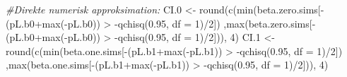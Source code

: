 \documentclass[
]{article}
\newenvironment{Shaded}{\begin{snugshade}}{\end{snugshade}}
\newcommand{\AttributeTok}[1]{\textcolor[rgb]{0.77,0.63,0.00}{#1}}
\newcommand{\CommentTok}[1]{\textcolor[rgb]{0.56,0.35,0.01}{\textit{#1}}}
\newcommand{\DecValTok}[1]{\textcolor[rgb]{0.00,0.00,0.81}{#1}}
\newcommand{\FloatTok}[1]{\textcolor[rgb]{0.00,0.00,0.81}{#1}}
\newcommand{\FunctionTok}[1]{\textcolor[rgb]{0.00,0.00,0.00}{#1}}
\newcommand{\NormalTok}[1]{#1}
\newcommand{\OtherTok}[1]{\textcolor[rgb]{0.56,0.35,0.01}{#1}}
\newcommand{\SpecialCharTok}[1]{\textcolor[rgb]{0.00,0.00,0.00}{#1}}
\begin{document}
\begin{Shaded}
\begin{Highlighting}[]
\CommentTok{\#Direkte numerisk approksimation:}
\NormalTok{CI}\FloatTok{.0} \OtherTok{\textless{}{-}} \FunctionTok{round}\NormalTok{(}\FunctionTok{c}\NormalTok{(}\FunctionTok{min}\NormalTok{(beta.zero.sims[}\SpecialCharTok{{-}}\NormalTok{(pL.b0}\SpecialCharTok{+}\FunctionTok{max}\NormalTok{(}\SpecialCharTok{{-}}\NormalTok{pL.b0)) }\SpecialCharTok{\textgreater{}} \SpecialCharTok{{-}}\FunctionTok{qchisq}\NormalTok{(}\FloatTok{0.95}\NormalTok{, }\AttributeTok{df =} \DecValTok{1}\NormalTok{)}\SpecialCharTok{/}\DecValTok{2}\NormalTok{])}
\NormalTok{           ,}\FunctionTok{max}\NormalTok{(beta.zero.sims[}\SpecialCharTok{{-}}\NormalTok{(pL.b0}\SpecialCharTok{+}\FunctionTok{max}\NormalTok{(}\SpecialCharTok{{-}}\NormalTok{pL.b0)) }\SpecialCharTok{\textgreater{}} \SpecialCharTok{{-}}\FunctionTok{qchisq}\NormalTok{(}\FloatTok{0.95}\NormalTok{, }\AttributeTok{df =} \DecValTok{1}\NormalTok{)}\SpecialCharTok{/}\DecValTok{2}\NormalTok{])), }\DecValTok{4}\NormalTok{)}
\NormalTok{CI}\FloatTok{.1} \OtherTok{\textless{}{-}} \FunctionTok{round}\NormalTok{(}\FunctionTok{c}\NormalTok{(}\FunctionTok{min}\NormalTok{(beta.one.sims[}\SpecialCharTok{{-}}\NormalTok{(pL.b1}\SpecialCharTok{+}\FunctionTok{max}\NormalTok{(}\SpecialCharTok{{-}}\NormalTok{pL.b1)) }\SpecialCharTok{\textgreater{}} \SpecialCharTok{{-}}\FunctionTok{qchisq}\NormalTok{(}\FloatTok{0.95}\NormalTok{, }\AttributeTok{df =} \DecValTok{1}\NormalTok{)}\SpecialCharTok{/}\DecValTok{2}\NormalTok{])}
\NormalTok{           ,}\FunctionTok{max}\NormalTok{(beta.one.sims[}\SpecialCharTok{{-}}\NormalTok{(pL.b1}\SpecialCharTok{+}\FunctionTok{max}\NormalTok{(}\SpecialCharTok{{-}}\NormalTok{pL.b1)) }\SpecialCharTok{\textgreater{}} \SpecialCharTok{{-}}\FunctionTok{qchisq}\NormalTok{(}\FloatTok{0.95}\NormalTok{, }\AttributeTok{df =} \DecValTok{1}\NormalTok{)}\SpecialCharTok{/}\DecValTok{2}\NormalTok{])), }\DecValTok{4}\NormalTok{)}


\end{Highlighting}
\end{Shaded}
\end{document}
